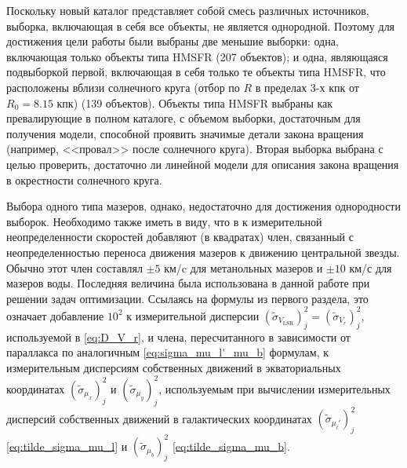 \documentclass[a4paper, oneside, 14pt]{article}
\begin{document}
Поскольку новый каталог представляет собой смесь различных источников, выборка, включающая в себя все объекты, не является однородной. Поэтому для достижения цели работы были выбраны две меньшие выборки: одна, включающая только объекты типа HMSFR (207 объектов); и одна, являющаяся подвыборкой первой, включающая в себя только те объекты типа HMSFR, что расположены вблизи солнечного круга (отбор по $ R $ в пределах 3-х кпк от $ R_0 = 8.15 $ кпк) (139 объектов). Объекты типа HMSFR выбраны как превалирующие в полном каталоге, с объемом выборки, достаточным для получения модели, способной проявить значимые детали закона вращения (например, <<провал>> после солнечного круга). Вторая выборка выбрана с целью проверить, достаточно ли линейной модели для описания закона вращения в окрестности солнечного круга.

Выбора одного типа мазеров, однако, недостаточно для достижения однородности выборок. Необходимо также иметь в виду, что в \cite{R.2019} к измерительной неопределенности скоростей добавляют (в квадратах) член, связанный с неопределенностью переноса движения мазеров к движению центральной звезды. Обычно этот член составлял $ \pm 5 $ км/c для метанольных мазеров и $ \pm 10 $ км/с для мазеров воды. Последняя величина была использована в данной работе при решении задач оптимизации. Ссылаясь на формулы из первого раздела, это означает добавление $ 10^2 $ к измерительной дисперсии $ (\tilde{\sigma}_{V_{\text{LSR}}})_j^2 = (\tilde{\sigma}_{V_r})_j^2 $, используемой в \eqref{eq:D_V_r}, и члена, пересчитанного в зависимости от параллакса по аналогичным \eqref{eq:sigma_mu_l'_mu_b} формулам, к измерительным дисперсиям собственных движений в экваториальных координатах $ (\tilde{\sigma}_{\mu_x})_j^2 $ и $ (\tilde{\sigma}_{\mu_y})_j^2 $, используемым при вычислении измерительных дисперсий собственных движений в галактических координатах $ (\tilde{\sigma}_{\mu_l'})_j^2 $ \eqref{eq:tilde_sigma_mu_l} и $ (\tilde{\sigma}_{\mu_b})_j^2 $ \eqref{eq:tilde_sigma_mu_b}.


\clearpage

\end{document}
